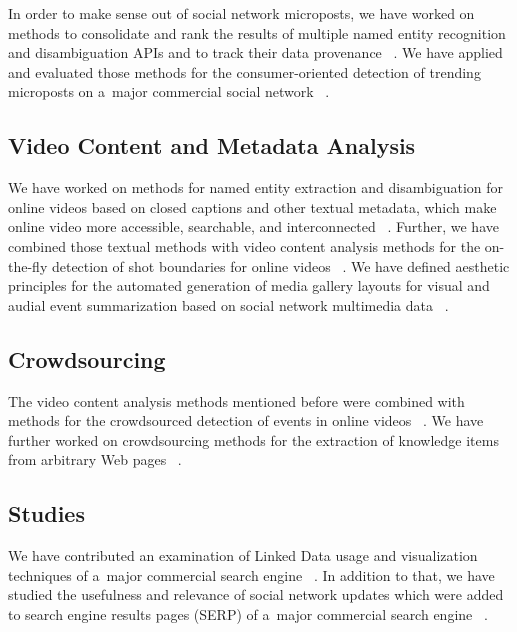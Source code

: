 In order to make sense out of social network microposts,
we have worked on methods to consolidate and rank
the results of multiple named entity recognition and
disambiguation APIs and to track their data provenance~%
\cite{steiner2011addingmeaning}.
We have applied and evaluated those methods
for the consumer-oriented detection of trending microposts
on a~major commercial social network~%
\cite{steiner2011tweetconsumers}.


\subsection{Video Content and Metadata Analysis}

We have worked on methods for named entity extraction and
disambiguation for online videos based on closed captions
and other textual metadata, which make online video
more accessible, searchable, and interconnected~%
\cite{steiner2010semwebvid,steiner2010semwebvidchallenge}.
Further, we have combined those textual methods with 
video content analysis methods for the on-the-fly detection
of shot boundaries for online videos~%
\cite{steiner2012shotdetection}.
We have defined aesthetic principles
for the automated generation of media gallery layouts
for visual and audial event summarization
based on social network multimedia data~%
\cite{steiner2012definingaesthetic}.
        
\subsection{Crowdsourcing}

The video content analysis methods mentioned before
were combined with methods for the crowdsourced detection
of events in online videos~%
\cite{steiner2011crowdsourcingevent}.
We have further worked on crowdsourcing methods
for the extraction of knowledge items from arbitrary Web pages~%
\cite{steiner2012sekiathome,steiner2012sekiathomechallenge}.

\subsection{Studies}

We have contributed an examination of Linked Data usage and
visualization techniques of a~major commercial search engine~%
\cite{steiner2010howgoogleisusing}.
In addition to that, we have studied the usefulness and relevance
of social network updates which were added to search engine
results pages (SERP) of a~major commercial search engine~%
\cite{steiner2012addingrealtime}.

